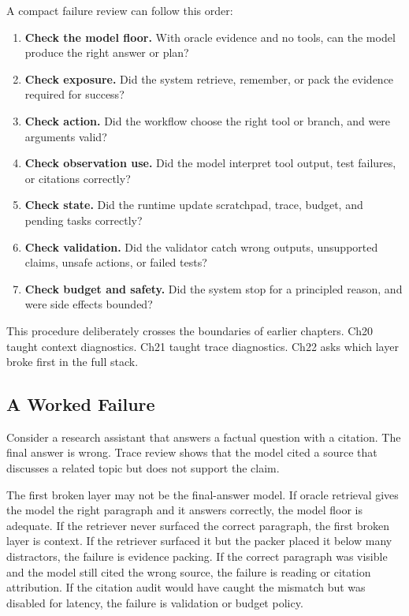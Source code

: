 A compact failure review can follow this order:

\begin{enumerate}[leftmargin=1.5em]
  \item \textbf{Check the model floor.} With oracle evidence and no tools, can the model produce the right answer or plan?
  \item \textbf{Check exposure.} Did the system retrieve, remember, or pack the evidence required for success?
  \item \textbf{Check action.} Did the workflow choose the right tool or branch, and were arguments valid?
  \item \textbf{Check observation use.} Did the model interpret tool output, test failures, or citations correctly?
  \item \textbf{Check state.} Did the runtime update scratchpad, trace, budget, and pending tasks correctly?
  \item \textbf{Check validation.} Did the validator catch wrong outputs, unsupported claims, unsafe actions, or failed tests?
  \item \textbf{Check budget and safety.} Did the system stop for a principled reason, and were side effects bounded?
\end{enumerate}

This procedure deliberately crosses the boundaries of earlier chapters. Ch20 taught context diagnostics. Ch21 taught trace diagnostics. Ch22 asks which layer broke first in the full stack.

\subsection{A Worked Failure}

Consider a research assistant that answers a factual question with a citation. The final answer is wrong. Trace review shows that the model cited a source that discusses a related topic but does not support the claim.

The first broken layer may not be the final-answer model. If oracle retrieval gives the model the right paragraph and it answers correctly, the model floor is adequate. If the retriever never surfaced the correct paragraph, the first broken layer is context. If the retriever surfaced it but the packer placed it below many distractors, the failure is evidence packing. If the correct paragraph was visible and the model still cited the wrong source, the failure is reading or citation attribution. If the citation audit would have caught the mismatch but was disabled for latency, the failure is validation or budget policy.


